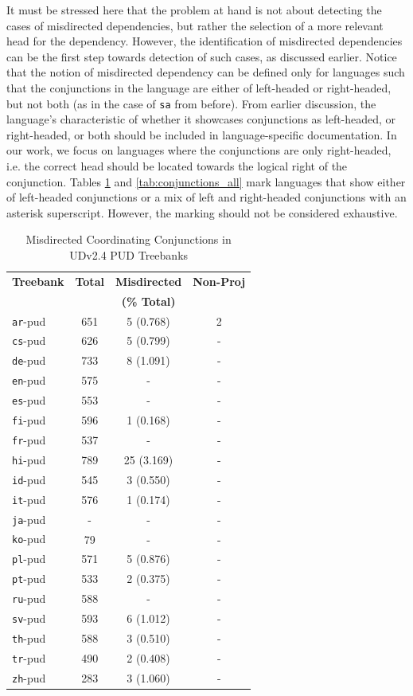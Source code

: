 It must be stressed here that the problem at hand is not about detecting the cases of misdirected dependencies, but rather the selection of a more relevant head for the dependency. However, the identification of misdirected dependencies can be the first step towards detection of such cases, as discussed earlier. Notice that the notion of misdirected dependency can be defined only for languages such that the conjunctions in the language are either of left-headed or right-headed, but not both (as in the case of \verb|sa| from before). From earlier discussion, the language's characteristic of whether it showcases conjunctions as left-headed, or right-headed, or both should be included in language-specific documentation. In our work, we focus on languages where the conjunctions are only right-headed, i.e. the correct head should be located towards the logical right of the conjunction. Tables \ref{tab:conjunctions_pud} and \ref{tab:conjunctions_all} mark languages that show either of left-headed conjunctions or a mix of left and right-headed conjunctions with an asterisk superscript. However, the marking should not be considered exhaustive.

\begin{table}[h]
\centering
\begin{tabular}{|l|c|c|c|}
\hline
\textbf{Treebank} & \textbf{Total} & \textbf{Misdirected} & \textbf{Non-Proj}\\
 & & \textbf{(\% Total)} & \\
\hline
\texttt{ar}-pud & 651 & 5 (0.768) & 2\\
\texttt{cs}-pud & 626 & 5 (0.799) & -\\
\texttt{de}-pud & 733 & 8 (1.091) & -\\
\texttt{en}-pud & 575 & - & -\\
\texttt{es}-pud & 553 & - & -\\
\texttt{fi}-pud & 596 & 1 (0.168) & -\\
\texttt{fr}-pud & 537 & - & -\\
\texttt{hi}-pud & 789 & 25 (3.169) & -\\
\texttt{id}-pud & 545 & 3 (0.550) & -\\
\texttt{it}-pud & 576 & 1 (0.174) & -\\
\texttt{ja}-pud & - & - & -\\
\texttt{ko}-pud & 79 & - & -\\
\texttt{pl}-pud & 571 & 5 (0.876) & -\\
\texttt{pt}-pud & 533 & 2 (0.375) & -\\
\texttt{ru}-pud & 588 & - & -\\
\texttt{sv}-pud & 593 & 6 (1.012) & -\\
\texttt{th}-pud & 588 & 3 (0.510) & -\\
\texttt{tr}-pud & 490 & 2 (0.408) & -\\
\texttt{zh}-pud & 283 & 3 (1.060) & -\\
\hline
\end{tabular}
\caption{Misdirected Coordinating Conjunctions in UDv2.4 PUD Treebanks}
\label{tab:conjunctions_pud}
\end{table}

